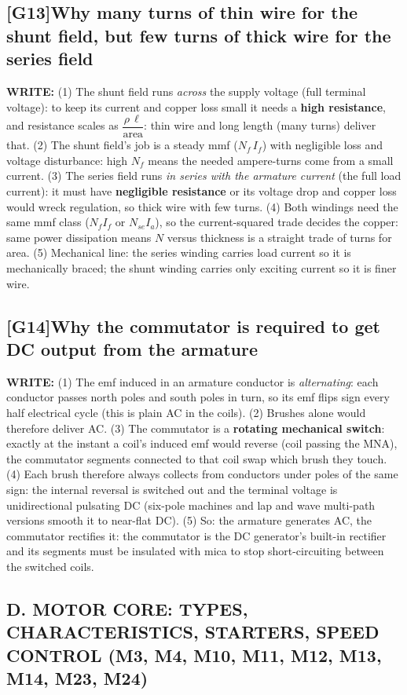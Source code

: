 \documentclass[11pt]{article}
\newcommand{\q}[2]{\subsection*{\color{copper}#1\quad\color{iron}#2}}
\newcommand{\w}[1]{\textbf{\color{copper}WRITE:} #1}
\begin{document}
\q{[G13]}{Why many turns of thin wire for the shunt field, but few turns of thick wire for the series field}
\w{(1) The shunt field runs \emph{across} the supply voltage (full terminal voltage): to keep its current and copper loss small it needs a \textbf{high resistance}, and resistance scales as $\dfrac{\rho\, \ell}{\text{area}}$: thin wire and long length (many turns) deliver that. (2) The shunt field's job is a steady mmf ($N_f\, I_f$) with negligible loss and voltage disturbance: high $N_f$ means the needed ampere-turns come from a small current. (3) The series field runs \emph{in series with the armature current} (the full load current): it must have \textbf{negligible resistance} or its voltage drop and copper loss would wreck regulation, so thick wire with few turns. (4) Both windings need the same mmf class ($N_f I_f$ or $N_{se} I_a$), so the current-squared trade decides the copper: same power dissipation means $N$ versus thickness is a straight trade of turns for area. (5) Mechanical line: the series winding carries load current so it is mechanically braced; the shunt winding carries only exciting current so it is finer wire.}

\q{[G14]}{Why the commutator is required to get DC output from the armature}
\w{(1) The emf induced in an armature conductor is \emph{alternating}: each conductor passes north poles and south poles in turn, so its emf flips sign every half electrical cycle (this is plain AC in the coils). (2) Brushes alone would therefore deliver AC. (3) The commutator is a \textbf{rotating mechanical switch}: exactly at the instant a coil's induced emf would reverse (coil passing the MNA), the commutator segments connected to that coil swap which brush they touch. (4) Each brush therefore always collects from conductors under poles of the same sign: the internal reversal is switched out and the terminal voltage is unidirectional pulsating DC (six-pole machines and lap and wave multi-path versions smooth it to near-flat DC). (5) So: the armature generates AC, the commutator rectifies it: the commutator is the DC generator's built-in rectifier and its segments must be insulated with mica to stop short-circuiting between the switched coils.}

\hrulefill
\subsection*{\color{copper}D. MOTOR CORE: TYPES, CHARACTERISTICS, STARTERS, SPEED CONTROL (M3, M4, M10, M11, M12, M13, M14, M23, M24)}
\end{document}
